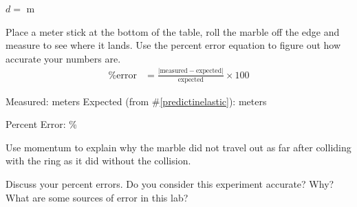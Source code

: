 \documentclass[10pt]{exam}
\begin{document}
\begin{questions}
\begin{flushright}
  $d =$ \fillin[][8em] m
\end{flushright}

\question
Place a meter stick at the bottom of the table, roll the marble off the edge and measure to see where it lands. Use the percent error equation to figure out how accurate your numbers are.
%
\begin{align*}
  \text{\% error} &=  
  \frac{
    \left|\text{measured}-\text{expected}\right|
    }{
      \text{expected}
    } 
  \times 100
\end{align*}

\begin{center}
  Measured: \fillin[][8em] meters
  \hspace{4em}
  Expected (from \#\ref{predictinelastic}): \fillin[][8em]  meters
  \vspace{2em}
\end{center}

\begin{flushright}
  Percent Error: \fillin[][5em] \%
\end{flushright}

\question
Use momentum to explain why the marble did not travel out as far after colliding with the ring as it did without the collision.
\vs

\question
Discuss your percent errors. Do you consider this experiment accurate? Why? What are some sources of error in this lab?
\vs


\end{questions}
\end{document}
